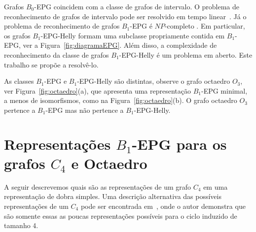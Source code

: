 Grafos $B_0$-EPG coincidem com a classe de grafos de intervalo. O problema de reconhecimento de grafos de intervalo pode ser resolvido em tempo linear~\cite{booth1976}. Já o problema de reconhecimento de grafos $ B_1$-EPG é $NP$-completo \cite {heldt2014}. Em particular, os grafos $ B_1$-EPG-Helly formam uma subclasse propriamente contida em $ B_1$-EPG, ver a Figura~\ref{fig:diagramaEPG}. Além disso, a complexidade de reconhecimento da classe de grafos $ B_1$-EPG-Helly é um problema em aberto. Este trabalho se propõe a resolvê-lo.%

As classes  $ B_1$-EPG e $ B_1$-EPG-Helly são distintas, observe o grafo octaedro $ O_3$, ver Figura~\ref{fig:octaedro}(a), que apresenta uma representação  $B_1$-EPG minimal, a menos de isomorfismos, como na Figura~\ref{fig:octaedro}(b). O grafo octaedro  $ O_3 $ pertence a $ B_1$-EPG mas não pertence a $B_1$-EPG-Helly.





\section{Representações $B_1$-EPG para os grafos $C_4$ e Octaedro}

A seguir descrevemos quais são as representações de um grafo $C_4$ em uma representação de dobra simples. Uma descrição alternativa das possíveis representações de um $C_4$ pode ser encontrada em~\cite{golumbic2009}, onde o autor demonstra que são somente essas as poucas representações possíveis para o ciclo induzido de tamanho 4.



